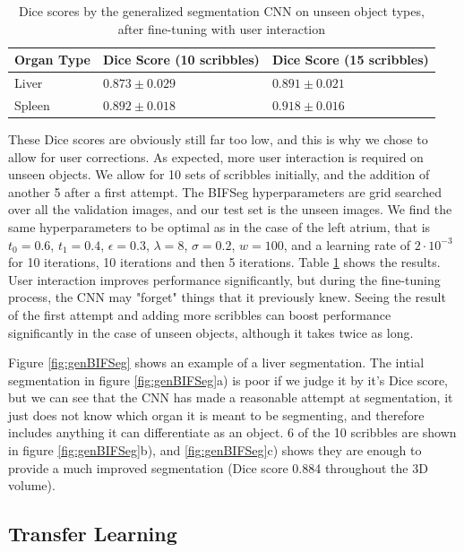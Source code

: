 \begin{table}[h!]
\centering
\begin{tabular}{|l|l|l|}
\hline
Organ Type   & Dice Score (10 scribbles) & Dice Score (15 scribbles) \\ \hline
Liver        & $0.873 \pm 0.029$ & $0.891 \pm 0.021$\\ 
Spleen       & $0.892 \pm 0.018$ & $0.918 \pm 0.016$ \\ \hline
\end{tabular}
\caption{Dice scores by the generalized segmentation CNN on unseen object types, after fine-tuning with user interaction}
\label{tab:resGenBIFUnseen}
\end{table}

These Dice scores are obviously still far too low, and this is why we chose to allow for user corrections. As expected, more user interaction is required on unseen objects. We allow for 10 sets of scribbles initially, and the addition of another 5 after a first attempt. The BIFSeg hyperparameters are grid searched over all the validation images, and our test set is the unseen images. We find the same hyperparameters to be optimal as in the case of the left atrium, that is $t_0=0.6$, $t_1=0.4$, $\epsilon=0.3$, $\lambda=8$, $\sigma=0.2$, $w=100$, and a learning rate of $2 \cdot 10^{-3}$ for 10 iterations, 10 iterations and then 5 iterations. Table \ref{tab:resGenBIFUnseen} shows the results. User interaction improves performance significantly, but during the fine-tuning process, the CNN may "forget" things that it previously knew. Seeing the result of the first attempt and adding more scribbles can boost performance significantly in the case of unseen objects, although it takes twice as long.

Figure \ref{fig:genBIFSeg} shows an example of a liver segmentation. The intial segmentation in figure \ref{fig:genBIFSeg}a) is poor if we judge it by it's Dice score, but we can see that the CNN has made a reasonable attempt at segmentation, it just does not know which organ it is meant to be segmenting, and therefore includes anything it can differentiate as an object. 6 of the 10 scribbles are shown in figure \ref{fig:genBIFSeg}b), and \ref{fig:genBIFSeg}c) shows they are enough to provide a much improved segmentation (Dice score 0.884 throughout the 3D volume).   


\subsection{Transfer Learning}

